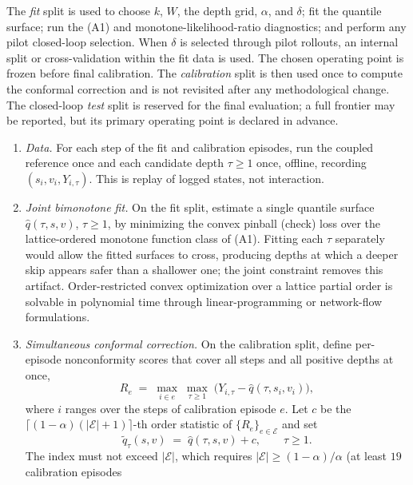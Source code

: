 \documentclass{article}
\begin{document}
The \emph{fit} split is used to choose $k$, $W$, the depth grid, $\alpha$, and
$\delta$; fit the quantile surface; run the (A1) and
monotone-likelihood-ratio diagnostics; and perform any pilot closed-loop
selection. When $\delta$ is selected through pilot rollouts, an internal split
or cross-validation within the fit data is used. The chosen operating point
is frozen before final calibration. The \emph{calibration} split is then used
once to compute the conformal correction and is not revisited after any
methodological change. The closed-loop \emph{test} split is reserved for the
final evaluation; a full frontier may be reported, but its primary operating
point is declared in advance.
\begin{enumerate}[leftmargin=1.5em, itemsep=0.25em, topsep=0.2em]
\item \emph{Data.} For each step of the fit and calibration episodes, run
the coupled reference once and each candidate depth $\tau \ge 1$ once,
offline, recording $(s_i, v_i, Y_{i,\tau})$. This is replay of logged
states, not interaction.
\item \emph{Joint bimonotone fit.} On the fit split, estimate a single
quantile surface $\hat{q}(\tau, s, v)$, $\tau \ge 1$, by minimizing the
convex pinball (check) loss over the lattice-ordered monotone function class
of (A1). Fitting each $\tau$ separately would allow the fitted surfaces to
cross, producing depths at which a deeper skip appears safer than a
shallower one; the joint constraint removes this artifact. Order-restricted
convex optimization over a lattice partial order is solvable in polynomial
time through linear-programming or network-flow formulations.
\item \emph{Simultaneous conformal correction.} On the calibration split,
define per-episode nonconformity scores that cover all steps and all
positive depths at once,
\begin{equation}
R_e \;=\; \max_{i \in e}\; \max_{\tau \ge 1}\;
\bigl( Y_{i,\tau} - \hat{q}(\tau, s_i, v_i) \bigr),
\label{eq:R}
\end{equation}
where $i$ ranges over the steps of calibration episode $e$. Let $c$ be the
$\lceil (1-\alpha)(|\mathcal{E}|+1) \rceil$-th order statistic of
$\{R_e\}_{e \in \mathcal{E}}$ and set
\begin{equation}
\tilde{q}_\tau(s, v) \;=\; \hat{q}(\tau, s, v) + c ,
\qquad \tau \ge 1 .
\label{eq:conformal}
\end{equation}
The index must not exceed $|\mathcal{E}|$, which requires
$|\mathcal{E}| \ge (1-\alpha)/\alpha$ (at least $19$ calibration episodes

\end{enumerate}
\end{document}
